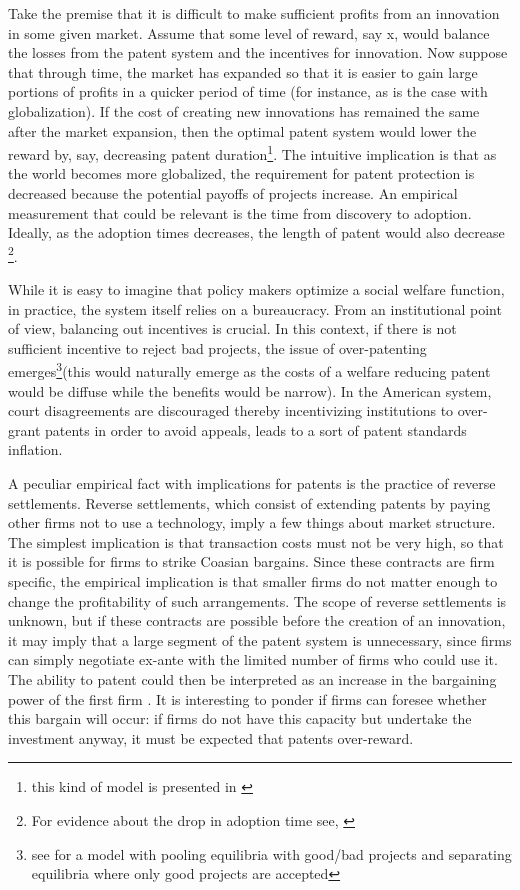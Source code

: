 Take the premise that it is difficult to make sufficient profits from an innovation in some given market. Assume that some level of reward, say x, would balance the losses from the patent system and the incentives for innovation. Now suppose that through time, the market has expanded so that it is easier to gain large portions of profits in a quicker period of time (for instance, as is the case with globalization). If the cost of creating new innovations has remained the same after the market expansion, then the optimal patent system would lower the reward by, say, decreasing patent duration\footnote{this kind of model is presented in \cite{boldrin2009market} }. The intuitive implication is that as the world becomes more globalized, the requirement for patent protection is decreased because the potential payoffs of projects increase. An empirical measurement that could be relevant is the time from discovery to adoption. Ideally, as the adoption times decreases, the length of patent would also decrease \footnote{For evidence about the drop in adoption time see, \cite{comin2006five}}. 

While it is easy to imagine that policy makers optimize a social welfare function, in practice, the system itself relies on a bureaucracy. From an institutional point of view, balancing out incentives is crucial. In this context, if there is not sufficient incentive to reject bad projects, the issue of over-patenting emerges\footnote{see \cite{Caillaud2012} for a model with pooling equilibria with good/bad projects and separating equilibria where only good projects are accepted}(this would naturally emerge as the costs of a welfare reducing patent would be diffuse while the benefits would be narrow). In the American system, court disagreements are discouraged thereby incentivizing institutions to over-grant patents in order to avoid appeals, leads to a sort of patent standards inflation\citep{Masur2011}.

A peculiar empirical fact with implications for patents is the practice of reverse settlements. Reverse settlements, which consist of extending patents by paying other firms not to use a technology, imply a few things about market structure. The simplest implication is that transaction costs must not be very high, so that it is possible for firms to strike Coasian bargains. Since these contracts are firm specific, the empirical implication is that smaller firms do not matter enough to change the profitability of such arrangements. The scope of reverse settlements is unknown, but if these contracts are possible before the creation of an innovation, it may imply that a large segment of the patent system is unnecessary, since firms can simply negotiate ex-ante with the limited number of firms who could use it. The ability to patent could then be interpreted as an increase in the bargaining power of the first firm \citep{Green1995}. It is interesting to ponder if firms can foresee whether this bargain will occur: if firms do not have this capacity but undertake the investment anyway, it must be expected that patents over-reward.

